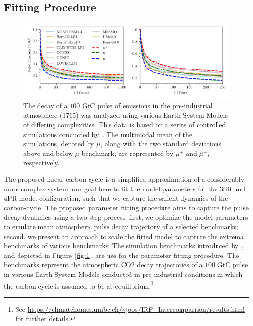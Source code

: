 \documentclass[11pt, a4paper, pdftex, twoside, dvipsnames]{article}
\renewcommand{\ref}{\cref}
\begin{document}
\subsection{Fitting Procedure} \label{sec:2.2}
\begin{figure}[t]
    \centering
    \includegraphics[width=\textwidth]{fig/solver_pulse.png}
    \caption{
    The decay of a $100$ GtC pulse of emissions in the pre-industrial atmosphere (1765) was analyzed using various Earth System Models of differing complexities.
    This data is based on a series of controlled simulations conducted by~\cite{joos2013carbon}.
    The multimodal mean of the simulations, denoted by $\mu$, along with the two standard deviations above and below $\mu$-benchmark, are represented by $\mu^+$ and $\mu^-$, respectively.
     }
    \label{fig:2}
\end{figure}
%

The proposed linear carbon-cycle is a simplified approximation of a considerably more complex system; our goal here to fit the model parameters for the $3$SR and $4$PR model configuration, such that we capture the salient dynamics of the carbon-cycle.
%
The proposed parameter fitting procedure aims to capture the pulse decay dynamics using a two-step process: first, we optimize the model parameters to emulate mean atmospheric pulse decay trajectory of a selected benchmarks; second, we present an approach to scale the fitted model to capture the extrema benchmarks of various benchmarks.
%
The simulation benchmarks introduced by~\cite{joos2013carbon}, and depicted in Figure~\ref{fig:1}, are use for the parameter fitting procedure. 
%
The benchmarks represent the atmospheric CO2 decay trajectories of a $100$ GtC pulse in various Earth System Models conducted in pre-industrial conditions in which the carbon-cycle is assumed to be at equilibrium.\footnote{See \url{https://climatehomes.unibe.ch/~joos/IRF_Intercomparison/results.html} for further details.}
\end{document}
